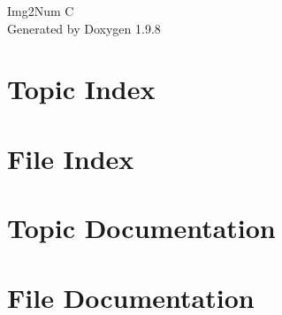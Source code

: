 \documentclass[twoside]{book}
\newcommand{\+}{\discretionary{\mbox{\scriptsize$\hookleftarrow$}}{}{}}
\newcommand{\clearemptydoublepage}{%
    \newpage{\pagestyle{empty}\cleardoublepage}%
  }
\begin{document}
  \raggedbottom
    \hypersetup{pageanchor=false,
                bookmarksnumbered=true,
                pdfencoding=unicode
               }
  \begin{titlepage}
  \vspace*{7cm}
  \begin{center}%
  {\Large Img2\+Num C}\\
  \vspace*{1cm}
  {\large Generated by Doxygen 1.9.8}\\
  \end{center}
  \end{titlepage}
  \clearemptydoublepage
  \tableofcontents
  \clearemptydoublepage
  \hypersetup{pageanchor=true}

\chapter{Topic Index}

\chapter{File Index}

\chapter{Topic Documentation}

\chapter{File Documentation}










  \backmatter
  \newpage
  \clearemptydoublepage
  \printindex
\end{document}
